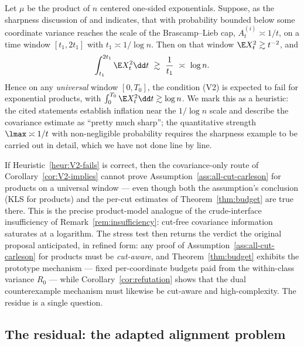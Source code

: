 \documentclass[../../main.tex]{subfiles}
\begin{document}
\begin{heuristic}
\label{heur:V2-fails}
Let $\mu$ be the product of $n$ centered one-sided exponentials. Suppose, as the sharpness discussion
of \cite[Remark~62]{KLnotes} and \cite{KlartagChenNotes} indicates, that with probability
bounded below some coordinate variance reaches the scale of the Brascamp--Lieb cap,
$A_t^{(i)}\asymp1/t$, on a time window $[t_1,2t_1]$ with $t_1\asymp1/\log n$. Then on that
window $\E X_t^2\gtrsim t^{-2}$, and
\[
  \int_{t_1}^{2t_1}\E X_t^2\dd t\ \gtrsim\ \frac1{t_1}\ \asymp\ \log n .
\]
Hence on any \emph{universal} window $[0,T_0]$, the condition \textup{(V2)} is expected to
fail for exponential products, with $\int_0^{T_0}\E X_t^2\dd t\gtrsim\log n$. We mark this as
a heuristic: the cited statements establish inflation near the $1/\log n$ scale and describe
the covariance estimate as ``pretty much sharp''; the quantitative strength
$\lmax\asymp1/t$ with non-negligible probability requires the sharpness example to be carried
out in detail, which we have not done line by line.
\end{heuristic}

\begin{remark}
\label{rem:covariance-route-dead}
If Heuristic~\ref{heur:V2-fails} is correct, then the covariance-only route of
Corollary~\ref{cor:V2-implies} cannot prove Assumption~\ref{ass:all-cut-carleson} for products on a universal window
--- even though both the assumption's conclusion (KLS for products) and the per-cut estimates
of Theorem~\ref{thm:budget} are true there. This is the precise product-model analogue of the
crude-interface insufficiency of Remark~\ref{rem:insufficiency}: cut-free covariance information
saturates at a logarithm. The stress test then returns the verdict the original proposal
anticipated, in refined form: any proof of Assumption~\ref{ass:all-cut-carleson} for products must be
\emph{cut-aware}, and Theorem~\ref{thm:budget} exhibits the prototype mechanism --- fixed
per-coordinate budgets paid from the within-class variance $R_0$ --- while
Corollary~\ref{cor:refutation} shows that the dual counterexample mechanism must likewise be
cut-aware and high-complexity. The residue is a single question.
\end{remark}

\subsection{The residual: the adapted alignment problem}
\label{sec:residual}
\end{document}
